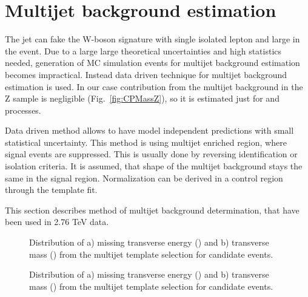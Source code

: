 \section{Multijet background estimation}\label{sec:QCD}


The jet can fake the W-boson signature with single isolated lepton and large \etmiss in the event. Due to a large large theoretical uncertainties and high statistics needed, generation of MC simulation events for multijet background estimation becomes impractical. Instead data driven technique for multijet background estimation is used. In our case contribution from the multijet background  in the Z sample is negligible (Fig.~\ref{fig:CPMassZ}), so it is estimated just for \wenu and \wmunu processes. 

Data driven method allows to have model independent predictions with small statistical uncertainty. This method is using multijet enriched region, where signal events are suppressed. This is usually done by reversing identification or isolation criteria. It is assumed, that shape of the multijet background stays the same in the signal region. Normalization can  be derived in a control region through the template fit. 

This section describes method of multijet background determination, that have been used in 2.76 TeV data. 


\begin{figure}[!tbp]
\begin{minipage}[h]{0.49\linewidth}
\end{minipage}
\hfill
\begin{minipage}[h]{0.49\linewidth}
\end{minipage}
\caption{Distribution of a) missing transverse energy (\etmiss) and  b) transverse mass (\mtw) from the multijet template selection for \wenu candidate events.}
\label{ris:TemplateE}

\vfill

\begin{minipage}[h]{0.49\linewidth}
\end{minipage}
\hfill
\begin{minipage}[h]{0.49\linewidth}
\end{minipage}
\caption{Distribution of a) missing transverse energy (\etmiss) and  b) transverse mass (\mtw) from the multijet template selection for \wmunu candidate events.}
\label{ris:TemplateMu}
\end{figure}

